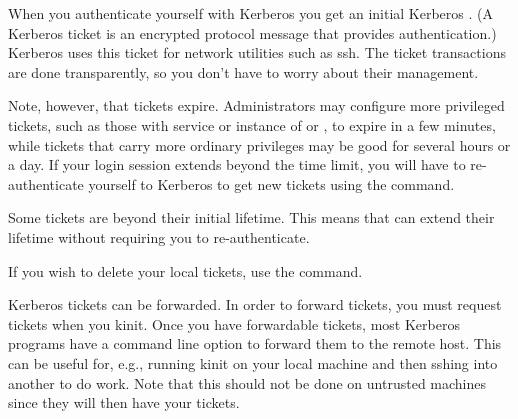 \documentclass[letterpaper,10pt,english]{sphinxmanual}
\begin{document}
When you authenticate yourself with Kerberos you get an initial
Kerberos .  (A Kerberos ticket is an encrypted protocol
message that provides authentication.)  Kerberos uses this ticket for
network utilities such as ssh.  The ticket transactions are done
transparently, so you don’t have to worry about their management.

Note, however, that tickets expire.  Administrators may configure more
privileged tickets, such as those with service or instance of 
or , to expire in a few minutes, while tickets that carry
more ordinary privileges may be good for several hours or a day.  If
your login session extends beyond the time limit, you will have to
re-authenticate yourself to Kerberos to get new tickets using the
{\hyperref[\detokenize{user/user_commands/kinit:kinit-1}]{}} command.

Some tickets are  beyond their initial lifetime.  This
means that  can extend their lifetime without requiring
you to re-authenticate.

If you wish to delete your local tickets, use the {\hyperref[\detokenize{user/user_commands/kdestroy:kdestroy-1}]{}}
command.

Kerberos tickets can be forwarded.  In order to forward tickets, you
must request  tickets when you kinit.  Once you have
forwardable tickets, most Kerberos programs have a command line option
to forward them to the remote host.  This can be useful for, e.g.,
running kinit on your local machine and then sshing into another to do
work.  Note that this should not be done on untrusted machines since
they will then have your tickets.
\end{document}
